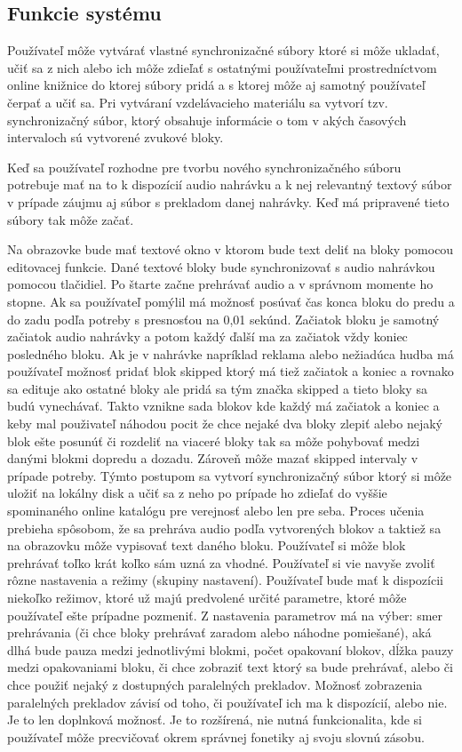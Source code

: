 \documentclass{article}
\begin{document}
\subsection{Funkcie systému}
Používateľ môže vytvárať vlastné synchronizačné súbory ktoré si môže ukladať, učiť sa z nich alebo ich môže zdieľať s ostatnými používateľmi prostredníctvom online knižnice do ktorej súbory pridá a s ktorej môže aj samotný používateľ čerpať a učiť sa. Pri vytváraní vzdelávacieho materiálu sa vytvorí tzv. synchronizačný súbor, ktorý obsahuje informácie o tom v akých časových intervaloch sú vytvorené zvukové bloky.

Keď sa používateľ rozhodne pre tvorbu nového synchronizačného súboru potrebuje mať na to k dispozícií audio nahrávku a k nej relevantný textový súbor v prípade záujmu aj súbor s prekladom danej nahrávky. Keď má pripravené tieto súbory tak môže začať. 

Na obrazovke bude mať textové okno v ktorom bude text deliť na bloky pomocou editovacej funkcie. Dané textové bloky bude synchronizovať s audio nahrávkou pomocou tlačidiel. Po štarte začne prehrávať audio a v správnom momente ho stopne. Ak sa používateľ pomýlil má možnosť posúvať čas konca bloku do predu a do zadu podľa potreby s presnosťou na 0,01 sekúnd. Začiatok bloku je samotný začiatok audio nahrávky a potom každý ďalší ma za začiatok vždy koniec posledného bloku. Ak je v nahrávke napríklad reklama alebo nežiadúca hudba má používateľ možnosť pridať blok skipped ktorý má tiež začiatok a koniec a rovnako sa edituje ako ostatné bloky ale pridá sa tým značka skipped a tieto bloky sa budú vynechávať. Takto vznikne sada blokov kde každý má začiatok a koniec a keby mal použivateľ náhodou pocit že chce nejaké dva bloky zlepiť alebo nejaký blok ešte posunúť či rozdeliť na viaceré bloky tak sa môže pohybovať medzi danými blokmi dopredu a dozadu. Zároveň môže mazať skipped intervaly v prípade potreby. Týmto postupom sa vytvorí synchronizačný súbor ktorý si môže uložiť na lokálny disk a učiť sa z neho po prípade ho zdieľať do vyššie spominaného online katalógu pre verejnosť alebo len pre seba. Proces učenia prebieha spôsobom, že sa prehráva audio podľa vytvorených blokov a taktiež sa na obrazovku môže vypisovať text daného bloku. Používateľ si môže blok prehrávať toľko krát koľko sám uzná za vhodné. Používateľ si vie navyše zvoliť rôzne nastavenia a režimy (skupiny nastavení). Používateľ bude mať k dispozícii niekoľko režimov, ktoré už majú predvolené určité parametre, ktoré môže používateľ ešte prípadne pozmeniť. Z nastavenia parametrov má na výber: smer prehrávania (či chce bloky prehrávať zaradom alebo náhodne pomiešané), aká dlhá bude pauza medzi jednotlivými blokmi, počet opakovaní blokov, dĺžka pauzy medzi opakovaniami bloku, či chce zobraziť text ktorý sa bude prehrávať, alebo či chce použiť nejaký z dostupných paralelných prekladov.  Možnosť zobrazenia paralelných prekladov závisí od toho, či používateľ ich ma k dispozícií, alebo nie. Je to len doplnková možnosť. Je to rozšírená, nie nutná funkcionalita, kde si používateľ môže precvičovať  okrem správnej fonetiky aj svoju slovnú zásobu.
\end{document}
